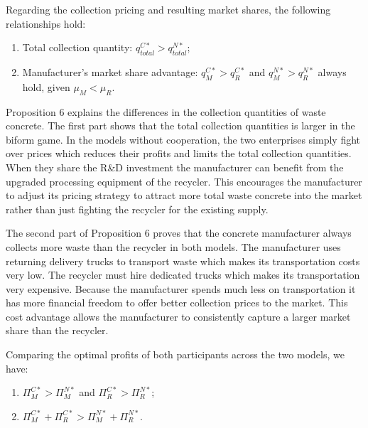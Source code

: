 \documentclass[authoryear,preprint,review,times,10pt]{elsarticle}
\begin{document}
\begin{prop}
\label{prop:pricing_comparison}
Regarding the collection pricing and resulting market shares, the following relationships hold:
\begin{enumerate}[label={(\arabic*)}]
\item Total collection quantity: $q_{total}^{C*} > q_{total}^{N*}$;
\item Manufacturer's market share advantage: $q_{M}^{C*} > q_{R}^{C*}$ and $q_{M}^{N*} > q_{R}^{N*}$ always hold, given $\mu_{M} < \mu_{R}$.
\end{enumerate}
\end{prop}

Proposition 6 explains the differences in the collection quantities of waste concrete. The first part shows that the total collection quantities is larger in the biform game. In the models without cooperation, the two enterprises simply fight over prices which reduces their profits and limits the total collection quantities. When they share the R\&D investment the manufacturer can benefit from the upgraded processing equipment of the recycler. This encourages the manufacturer to adjust its pricing strategy to attract more total waste concrete into the market rather than just fighting the recycler for the existing supply.

The second part of Proposition 6 proves that the concrete manufacturer always collects more waste than the recycler in both models. The manufacturer uses returning delivery trucks to transport waste which makes its transportation costs very low. The recycler must hire dedicated trucks which makes its transportation very expensive. Because the manufacturer spends much less on transportation it has more financial freedom to offer better collection prices to the market. This cost advantage allows the manufacturer to consistently capture a larger market share than the recycler.


\begin{prop}
\label{prop:profit_comparison}
Comparing the optimal profits of both participants across the two models, we have:
\begin{enumerate}[label={(\arabic*)}]
\item $\Pi_{M}^{C*} > \Pi_{M}^{N*}$ and $\Pi_{R}^{C*} > \Pi_{R}^{N*}$;
\item $\Pi_{M}^{C*} + \Pi_{R}^{C*} > \Pi_{M}^{N*} + \Pi_{R}^{N*}$.
\end{enumerate}
\end{prop}
\end{document}
